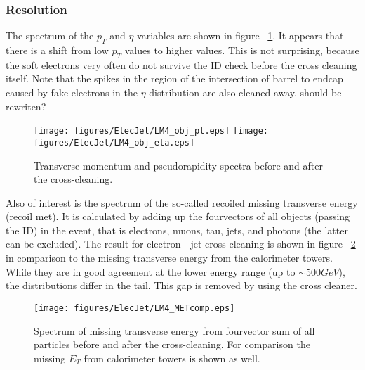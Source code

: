 \documentclass{cmspaper}
\begin{document}
\subsubsection{Resolution}


The spectrum of the \(p_T\) and \(\eta\) variables are shown in figure ~\ref{fig:objSpectra_ElecJet}. It appears that there is a shift from low \(p_T\) values to higher values. This is not surprising, because the soft electrons very often do not survive the ID check before the cross cleaning itself. Note that the spikes in the region of the intersection of barrel to endcap caused by fake electrons in the \(\eta\) distribution are also cleaned away. {\color{red}should be rewriten?}\\

\begin{figure}[hb]
\begin{center}
    \texttt{[image: figures/ElecJet/LM4\_obj\_pt.eps]}
    \texttt{[image: figures/ElecJet/LM4\_obj\_eta.eps]}
    \caption{Transverse momentum and pseudorapidity spectra before
    and after the cross-cleaning.}
\label{fig:objSpectra_ElecJet}
\end{center}
\end{figure}

Also of interest is the spectrum of the so-called recoiled missing transverse energy (recoil met). It is calculated by adding up the fourvectors of all objects (passing the ID) in the event, that is electrons, muons, tau, jets, and photons (the latter can be excluded). The result for electron - jet cross cleaning is shown in figure ~\ref{fig:met_ElecJet} in comparison to the missing transverse energy from the calorimeter towers. While they are in good agreement at the lower energy range (up to \(\sim 500 GeV\)), the distributions differ in the tail. This gap is removed by using the cross cleaner.

\begin{figure}[hb]
\begin{center}
    \texttt{[image: figures/ElecJet/LM4\_METcomp.eps]}
    \caption{Spectrum of missing transverse energy from fourvector sum of all
    particles before and after the cross-cleaning. For comparison the missing
    $E_T$ from calorimeter towers is shown as well.}
\label{fig:met_ElecJet}
\end{center}
\end{figure}
\end{document}
